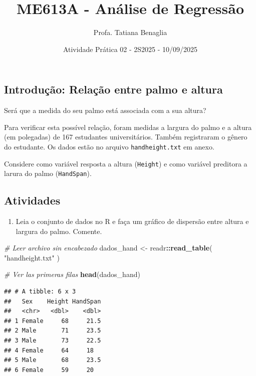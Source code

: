 \documentclass[
]{article}
\title{ME613A - Análise de Regressão}
\author{Profa. Tatiana Benaglia}
\date{Atividade Prática 02 - 2S2025 - 10/09/2025}
\newenvironment{Shaded}{\begin{snugshade}}{\end{snugshade}}
\newcommand{\CommentTok}[1]{\textcolor[rgb]{0.56,0.35,0.01}{\textit{#1}}}
\newcommand{\FunctionTok}[1]{\textcolor[rgb]{0.13,0.29,0.53}{\textbf{#1}}}
\newcommand{\NormalTok}[1]{#1}
\newcommand{\OtherTok}[1]{\textcolor[rgb]{0.56,0.35,0.01}{#1}}
\newcommand{\SpecialCharTok}[1]{\textcolor[rgb]{0.81,0.36,0.00}{\textbf{#1}}}
\newcommand{\StringTok}[1]{\textcolor[rgb]{0.31,0.60,0.02}{#1}}
\providecommand{\tightlist}{%
  \setlength{\itemsep}{0pt}\setlength{\parskip}{0pt}}
\begin{document}
\maketitle

\subsection{Introdução: Relação entre palmo e
altura}\label{introduuxe7uxe3o-relauxe7uxe3o-entre-palmo-e-altura}

Será que a medida do seu palmo está associada com a sua altura?

Para verificar esta possível relação, foram medidas a largura do palmo e
a altura (em polegadas) de 167 estudantes universitários. Também
registraram o gênero do estudante. Os dados estão no arquivo
\texttt{handheight.txt} em anexo.

Considere como variável resposta a altura (\texttt{Height}) e como
variável preditora a larura do palmo (\texttt{HandSpan}).

\subsection{Atividades}\label{atividades}

\begin{enumerate}
\def\labelenumi{\arabic{enumi}.}
\tightlist
\item
  Leia o conjunto de dados no R e faça um gráfico de dispersão entre
  altura e largura do palmo. Comente.
\end{enumerate}

\begin{Shaded}
\begin{Highlighting}[]
\CommentTok{\# Leer archivo sin encabezado}
\NormalTok{dados\_hand }\OtherTok{\textless{}{-}}\NormalTok{ readr}\SpecialCharTok{::}\FunctionTok{read\_table}\NormalTok{(}
  \StringTok{"handheight.txt"}
\NormalTok{)}


\CommentTok{\# Ver las primeras filas}
\FunctionTok{head}\NormalTok{(dados\_hand)}
\end{Highlighting}
\end{Shaded}

\begin{verbatim}
## # A tibble: 6 x 3
##   Sex    Height HandSpan
##   <chr>   <dbl>    <dbl>
## 1 Female     68     21.5
## 2 Male       71     23.5
## 3 Male       73     22.5
## 4 Female     64     18  
## 5 Male       68     23.5
## 6 Female     59     20
\end{verbatim}
\end{document}

